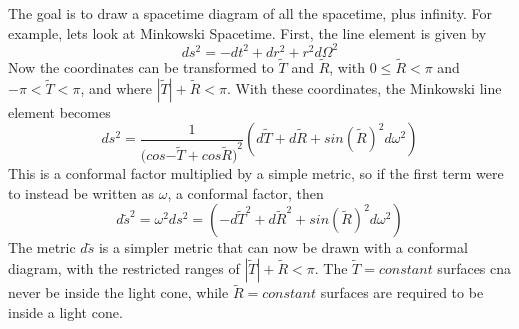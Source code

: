 \documentclass[10pt]{article}
\begin{document}
               
               	The goal is to draw a spacetime diagram of all the spacetime, plus infinity. For example, lets look at Minkowski Spacetime. First, the line element is given by
              \begin{equation}
                  ds^2=-dt^2+dr^2+r^2d\Omega^2
              \end{equation}
              Now the coordinates can be transformed to $\widetilde{T}$ and $\widetilde{R}$, with $0\leq \widetilde{R}<\pi$ and $-\pi<\widetilde{T}<\pi$, and where $|\widetilde{T}|+\widetilde{R}<\pi$. With these coordinates, the Minkowski line element becomes
              \begin{equation}
                  ds^2=\frac{1}{(cos{-\tilde{T}}+cos{\tilde{R})}^2}(d\tilde{T}+d\tilde{R}+sin(\tilde{R})^2d\omega^2)
              \end{equation}
              This is a conformal factor multiplied by a simple metric, so if the first term were to instead be written as $\omega$, a conformal factor, then
                            \begin{equation}
                                d\widetilde{s}^2=\omega^2ds^2=(-d\tilde{T}^2+d\tilde{R}^2+sin(\tilde{R})^2d\omega^2)
                            \end{equation}
                           The metric $d\widetilde{s}$ is a simpler metric that can now be drawn with a conformal diagram, with the restricted ranges of $|\widetilde{T}|+\widetilde{R}<\pi$. The  $\widetilde{T}=constant$ surfaces cna never be inside the light cone, while  $\widetilde{R}=constant$ surfaces are required to be inside a light cone.
                           
\end{document}
